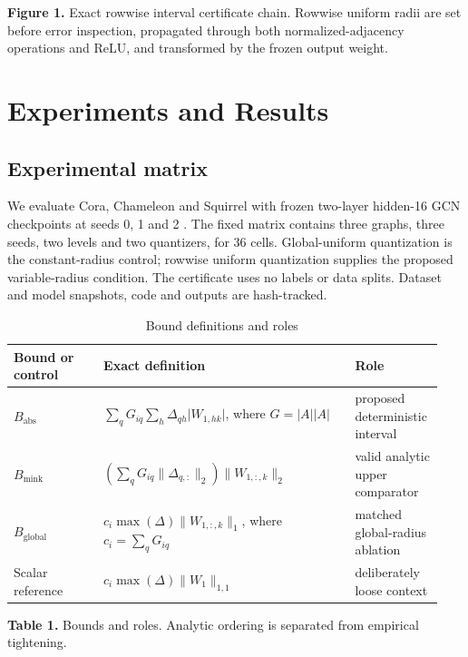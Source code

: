 \documentclass{article}
\begin{document}
\textbf{Figure 1.} Exact rowwise interval certificate chain. Rowwise uniform radii are set before error inspection, propagated through both normalized-adjacency operations and ReLU, and transformed by the frozen output weight.

\section{Experiments and Results}


\subsection{Experimental matrix}


We evaluate Cora, Chameleon and Squirrel with frozen two-layer hidden-16 GCN checkpoints at seeds 0, 1 and 2 \cite{yang2016planetoid,pei2020geomgnn,platonov2023heterophily}. The fixed matrix contains three graphs, three seeds, two levels and two quantizers, for 36 cells. Global-uniform quantization is the constant-radius control; rowwise uniform quantization supplies the proposed variable-radius condition. The certificate uses no labels or data splits. Dataset and model snapshots, code and outputs are hash-tracked.

\begin{table}[ht]
\centering
\caption{Bound definitions and roles}
\begin{tabular}{p{0.20\linewidth}p{0.56\linewidth}p{0.18\linewidth}}
\toprule
\textbf{Bound or control} & \textbf{Exact definition} & \textbf{Role} \\
\midrule
\(B_{\mathrm{abs}}\) & \(\sum_q G_{iq}\sum_h \Delta_{qh}\lvert W_{1,hk}\rvert\), where \(G=\lvert A\rvert\lvert A\rvert\) & proposed deterministic interval \\
\(B_{\mathrm{mink}}\) & \(\left(\sum_q G_{iq}\lVert\Delta_{q,:}\rVert_2\right)\lVert W_{1,:,k}\rVert_2\) & valid analytic upper comparator \\
\(B_{\mathrm{global}}\) & \(c_i\max(\Delta)\lVert W_{1,:,k}\rVert_1\), where \(c_i=\sum_qG_{iq}\) & matched global-radius ablation \\
Scalar reference & \(c_i\max(\Delta)\lVert W_1\rVert_{1,1}\) & deliberately loose context \\
\bottomrule
\end{tabular}
\end{table}

\textbf{Table 1.} Bounds and roles. Analytic ordering is separated from empirical tightening.
\end{document}
